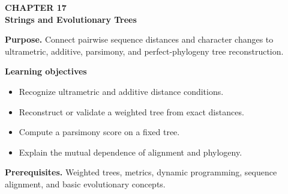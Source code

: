 \documentclass[11pt]{article}
\begin{document}
\begin{tcolorbox}[
  enhanced,breakable,colback=Primary!4,colframe=Primary,boxrule=0.9pt,
  arc=2mm,left=3mm,right=3mm,top=2.5mm,bottom=2.5mm]
{\sffamily\color{Accent}\bfseries CHAPTER 17}\\[-1pt]
{\sffamily\LARGE\bfseries\color{Primary} Strings and Evolutionary Trees}

\vspace{2pt}
\textbf{Purpose.} Connect pairwise sequence distances and character changes to ultrametric, additive, parsimony, and perfect-phylogeny tree reconstruction.

\textbf{Learning objectives}
\begin{itemize}
  \item Recognize ultrametric and additive distance conditions.
  \item Reconstruct or validate a weighted tree from exact distances.
  \item Compute a parsimony score on a fixed tree.
  \item Explain the mutual dependence of alignment and phylogeny.
\end{itemize}

\textbf{Prerequisites.} Weighted trees, metrics, dynamic programming, sequence alignment, and basic evolutionary concepts.
\end{tcolorbox}
\end{document}
